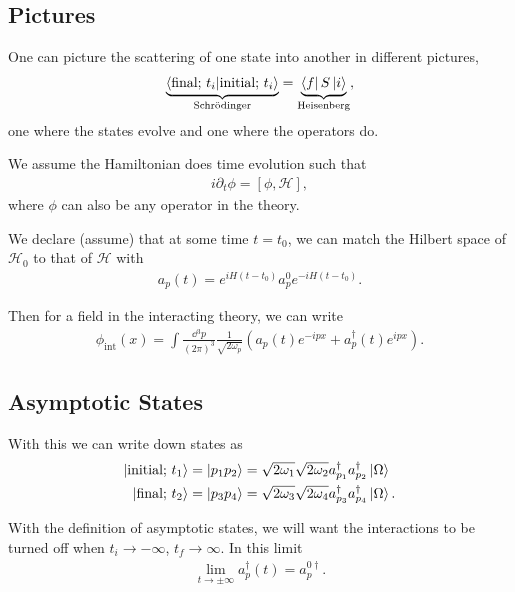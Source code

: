 
\subsection{Pictures}
One can picture the scattering of one state into another in different pictures,
\begin{align}
    \underbrace{\bra{\text{final;}~t_i} \ket{\text{initial;}~t_i}}_{\text{Schrödinger}}  = \underbrace{\bra{f} S \ket{i}}_{\text{Heisenberg}}
,\end{align}
one where the states evolve and one where the operators do.

We assume the Hamiltonian does time evolution such that
\begin{align}
    i \partial_t \phi = \left[ \phi, \mathcal{H} \right] 
,\end{align}
where $\phi$ can also be any operator in the theory.

We declare (assume) that at some time $t = t_0$, we can match the Hilbert space of $\mathcal{H}_0$ to that of $\mathcal{H}$ with
\begin{align}
    a_p \left( t \right) = e^{i H \left( t - t_0 \right) } a^{0}_p e^{-i H \left( t - t_0 \right) }
.\end{align}

Then for a field in the interacting theory, we can write
\begin{align}
    \phi_\text{int} \left( x \right) = \int \frac{\dd{^3p}}{\left( 2\pi \right)^3} \frac{1}{\sqrt{2 \omega_p} } \left( a_p \left( t \right) e^{-i p x} + a_p^{\dag} \left( t \right) e^{i p x} \right) 
.\end{align}

\subsection{Asymptotic States}

With this we can write down states as
\begin{align}
    \ket{\text{initial; }t_1} &= \ket{p_1 p_2} = \sqrt{2 \omega_1 }  \sqrt{2 \omega_2}  a^{\dag}_{p_1} a^{\dag}_{p_2} \ket{\Omega} \\
    \ket{\text{final; }t_2} &= \ket{p_3 p_4} = \sqrt{2 \omega_3 }  \sqrt{2 \omega_4}  a^{\dag}_{p_3} a^{\dag}_{p_4} \ket{\Omega}
.\end{align}

With the definition of asymptotic states, we will want the interactions to be turned off when $t_i \to - \infty$, $t_f \to \infty$. In this limit
\begin{align}
    \lim_{t \to \pm\infty}  a^{\dag}_p\left( t \right) = a_p^{0\dag}
.\end{align}


